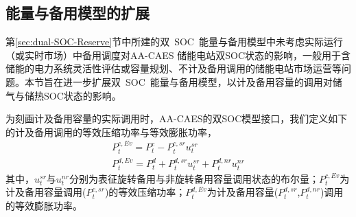 \subsection{能量与备用模型的扩展}
\label{sec:dual-SOC-Reserve-exten}
第\ref{sec:dual-SOC-Reserve}节中所建的双~SOC~能量与备用模型中未考虑实际运行（或实时市场）中备用调度对AA-CAES 储能电站双SOC状态的影响，一般用于含储能的电力系统灵活性评估或容量规划、不计及备用调用的储能电站市场运营等问题。本节旨在进一步扩展双~SOC~能量与备用模型，以计及备用容量的调用对储气与储热SOC状态的影响。

为刻画计及备用容量的实际调用时，AA-CAES的双SOC模型接口，我们定义如下的计及备用调用的等效压缩功率与等效膨胀功率，
\begin{subequations}
\label{equ:def-power-relation}
\begin{gather}
P_t^{c,Ev} = P_t^c - P_t^{c,sr}u_t^{sr}\\
P_t^{d,Ev} = P_t^d + P_t^{d,sr}u_t^{sr} + P_t^{d,nr}u_t^{nr}
\end{gather}
\end{subequations}
其中，$u_t^{sr}$与$u_t^{nr}$分别为表征旋转备用与非旋转备用容量调用状态的布尔量；$P_t^{c,Ev}$为计及备用容量调用($P_t^{c,sr}$)的等效压缩功率；$P_t^{d,Ev}$为计及备用容量($P_t^{d,sr}$,$P_t^{d,nr}$)调用的等效膨胀功率。


